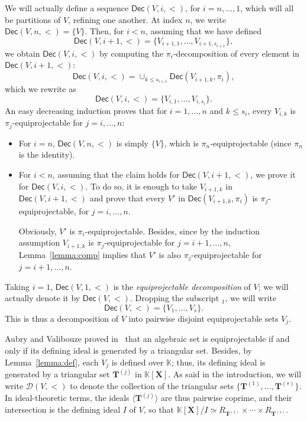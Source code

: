 \documentclass[12pt]{article}
\def\K {\ensuremath{\mathbb{K}}}
\def\Tt {\ensuremath{\mathbf{T}}}
\def\X {\ensuremath{\mathbf{X}}}
\def\Dr {\ensuremath{\mathscr D}}
\def\Dec {\ensuremath{\mathsf{Dec}}}
\begin{document}
We will actually define a sequence $\Dec(V,i,<)$, for $i=n,\dots,1$,
which will all be partitions of $V$, refining one another. At index
$n$, we write $\Dec(V,n,<) = \{V\}$. Then, for $i<n$, assuming that we
have defined
$$\Dec(V,i+1,<)=\{V_{i+1,1},\dots,V_{i+1,s_{i+1}}\},$$
we obtain $\Dec(V,i,<)$ by computing the $\pi_i$-decomposition of
every element in $\Dec(V,i+1,<)$:
$$\Dec(V,i,<) =\cup_{k \le s_{i+1}} \Dec(V_{i+1,k},\pi_i),$$ 
which we rewrite as $$\Dec(V,i,<)=\{V_{i,1},\dots,V_{i,s_{i}}\}.$$
An easy
decreasing induction proves that for $i=1,\dots,n$ and $k \le s_i$,
every $V_{i,k}$ is $\pi_j$-equiprojectable for $j=i,\dots,n$:
\begin{itemize}
\item For $i=n$, $\Dec(V,n,<)$ is simply $\{V\}$, which is
  $\pi_n$-equiprojectable (since $\pi_n$ is the identity).
\item For $i<n$, assuming that the claim holds for $\Dec(V,i+1,<)$, we
  prove it for $\Dec(V,i,<)$. To do so, it is enough to take
  $V_{i+1,k}$ in $\Dec(V,i+1,<)$ and prove that every $V'$ in
  $\Dec(V_{i+1,k},\pi_i)$ is $\pi_j$-equiprojectable, for
  $j=i,\dots,n$.

  Obviously, $V'$ is $\pi_i$-equiprojectable. Besides, since by the
  induction assumption $V_{i+1,k}$ is $\pi_j$-equiprojectable for
  $j=i+1,\dots,n$, Lemma~\ref{lemma:comp} implies that $V'$ is also
  $\pi_j$-equiprojectable for $j=i+1,\dots,n$.
\end{itemize}
Taking $i=1$, $\Dec(V,1,<)$ is the {\em equiprojectable decomposition}
of $V$; we will actually denote it by $\Dec(V,<)$. Dropping the
subscript ${}_1$, we will write
$$\Dec(V,<)=\{V_{1},\dots,V_{s}\}.$$ This is thus a decomposition of $V$
into pairwise disjoint equiprojectable sets $V_j$.

Aubry and Valibouze proved in~\cite{AuVa00} that an algebraic set is
equiprojectable if and only if its defining ideal is generated by a
triangular set. Besides, by Lemma~\ref{lemma:def}, each $V_j$ is
defined over $\K$; thus, its defining ideal is generated by a
triangular set $\Tt^{(j)}$ in $\K[\X]$. As said in the introduction,
we will write $\Dr(V,<)$ to denote the collection of the triangular
sets $\{\Tt^{(1)},\dots,\Tt^{(s)}\}$. In ideal-theoretic terms, the
ideals $\langle \Tt^{(j)}\rangle$ are thus pairwise coprime, and their
intersection is the defining ideal $I$ of $V$, so that $\K[\X]/I\simeq 
R_{\Tt^{(1)}} \times \cdots \times R_{\Tt^{(s)}}$.



\medskip
\end{document}
